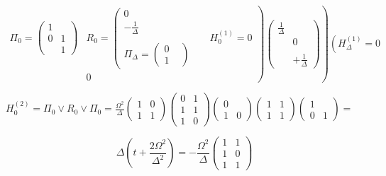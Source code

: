 $$
\left.\left.\begin{array}{lll}\Pi_{0}=\left(\begin{array}{ll}1 & \\ 0 & 1 \\ & 1\end{array}\right) & R_{0}=\left(\begin{array}{cc}0 & \\ -\frac{1}{\Delta} & \\ & \\ \Pi_{\Delta}=\left(\begin{array}{ll}0 & \\ 1\end{array}\right) & \end{array}\right. & H_{0}^{(1)}=0 \\ & 0
\end{array}\right)\left(\begin{array}{cc}\frac{1}{\Delta} & \\ & 0 \\ & \\ & +\frac{1}{\Delta}\end{array}\right)\right)\left(H_{\Delta}^{(1)}=0
$$

$H_{0}^{(2)}=\Pi_{0} \vee R_{0} \vee \Pi_{0}=\frac{\Omega^{2}}{\Delta}\left(\begin{array}{ll}1 & 0 \\ 1 & 1
\end{array}\right)\left(\begin{array}{ll}0 & 1 \\ 1 & 1 \\ 1 & 0
\end{array}\right)\left(\begin{array}{ll}0 & \\ 1 & 0
\end{array}\right)\left(\begin{array}{ll}1 & 1 \\ 1 & 1\end{array}\right)\left(\begin{array}{ll}1 & \\ 0 & 1
\end{array}\right)=$

$$
\Delta\left(t+\frac{2 \Omega^{2}}{\Delta^{2}}\right)=-\frac{\Omega^{2}}{\Delta}\left(\begin{array}{ll}1 & 1 \\ 1 & 0 \\ 1 & 1\end{array}\right)
$$

